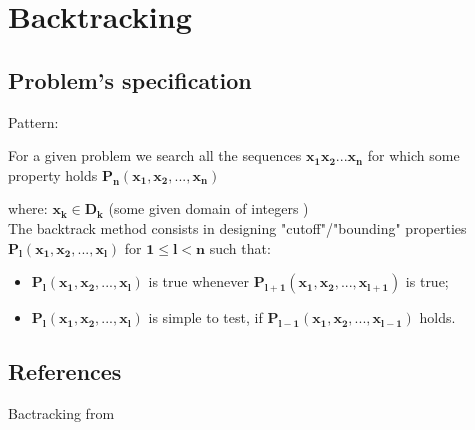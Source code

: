 \chapter{Backtracking}
\section{Problem's specification}

Pattern:

For a given problem we search all the sequences  $\bm{x_{1}x_{2} ... x_{n}}$ for which some property holds
 $\bm{P_n(x_{1},x_{2}, ..., x_{n})}$

\bigskip where: $\bm{x_k \in D_k}$ (some given domain of integers )
\\
The backtrack method consists in designing "cutoff"/"bounding" properties $\bm{P_l(x_{1},x_{2}, ..., x_{l})}$ for $\bm{1\leq l < n}$ such that: 

\begin{itemize}
 \item $\bm{P_l(x_{1},x_{2}, ..., x_{l})}$ is true whenever $\bm{P_{l+1}(x_{1},x_{2}, ..., x_{l+1})}$ is true;
 \item $\bm{P_l(x_{1},x_{2}, ..., x_{l})}$ is simple to test, if $\bm{P_{l-1}(x_{1},x_{2}, ..., x_{l-1})}$ holds.
 
\end{itemize}




\section{References}

Bactracking from \cite{KnuthArtOfCompProg4-5b}